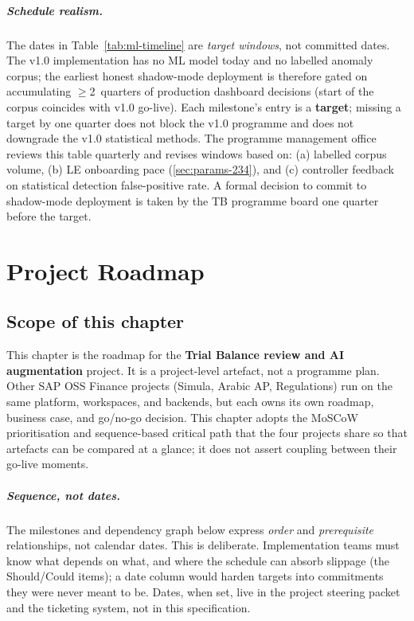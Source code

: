 \documentclass[11pt,a4paper,twoside]{report}
\begin{document}
\paragraph{Schedule realism.}
The dates in Table~\ref{tab:ml-timeline} are \emph{target windows},
not committed dates. The v1.0 implementation has no ML model today
and no labelled anomaly corpus; the earliest honest shadow-mode
deployment is therefore gated on accumulating $\ge$2~quarters of
production dashboard decisions (start of the corpus coincides with
v1.0 go-live). Each milestone's entry is a \textbf{target}; missing
a target by one quarter does not block the v1.0 programme and does
not downgrade the v1.0 statistical methods. The programme
management office reviews this table quarterly and revises windows
based on: (a) labelled corpus volume, (b) LE onboarding pace
(\cref{sec:params-234}), and (c) controller feedback on
statistical detection false-positive rate. A formal decision to
commit to shadow-mode deployment is taken by the TB programme
board one quarter before the target.
\chapter{Project Roadmap}\label{ch:tb-roadmap}

\section*{Scope of this chapter}

This chapter is the roadmap for the \textbf{Trial Balance review and AI
augmentation} project. It is a project-level artefact, not a programme
plan. Other SAP OSS Finance projects (Simula, Arabic AP, Regulations)
run on the same platform, workspaces, and backends, but each owns its
own roadmap, business case, and go/no-go decision. This chapter adopts
the MoSCoW prioritisation and sequence-based critical path that the
four projects share so that artefacts can be compared at a glance; it
does not assert coupling between their go-live moments.

\paragraph{Sequence, not dates.}
The milestones and dependency graph below express \emph{order} and
\emph{prerequisite} relationships, not calendar dates. This is
deliberate. Implementation teams must know what depends on what, and
where the schedule can absorb slippage (the Should/Could items); a
date column would harden targets into commitments they were never
meant to be. Dates, when set, live in the project steering packet and
the ticketing system, not in this specification.
\end{document}
